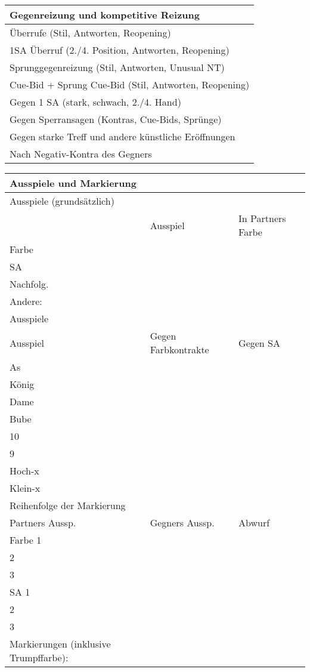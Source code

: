 \documentclass{article}
\begin{document}
\begin{multicols}{3}

\begin{tabular}{|l|}
\hline Gegenreizung und kompetitive Reizung \\
\hline Überrufe (Stil, Antworten, Reopening) \\
\hline 1SA Überruf (2./4. Position, Antworten, Reopening) \\
\hline Sprunggegenreizung (Stil, Antworten, Unusual NT) \\
\hline Cue-Bid + Sprung Cue-Bid (Stil, Antworten, Reopening) \\
\hline Gegen 1 SA (stark, schwach, 2./4. Hand) \\
\hline Gegen Sperransagen (Kontras, Cue-Bids, Sprünge) \\
\hline Gegen starke Treff und andere künstliche Eröffnungen \\
\hline Nach Negativ-Kontra des Gegners \\
\hline \end{tabular}

\begin{tabular}{|l|l|l|}
\hline Ausspiele und Markierung \\
\hline Ausspiele (grundsätzlich) \\
\hline & Ausspiel & In Partners Farbe \\
\hline Farbe & \\
\hline SA & \\
\hline Nachfolg. & \\
\hline Andere: \\

\hline Ausspiele \\
\hline Ausspiel & Gegen Farbkontrakte & Gegen SA \\
\hline As \\
\hline König \\
\hline Dame \\
\hline Bube \\
\hline 10 \\
\hline 9 \\
\hline Hoch-x \\
\hline Klein-x \\

\hline Reihenfolge der Markierung \\
\hline Partners Aussp. & Gegners Aussp. & Abwurf \\
\hline Farbe 1 \\
\hline 2 \\
\hline 3 \\
\hline SA 1 \\
\hline 2 \\
\hline 3 \\
\hline Markierungen (inklusive Trumpffarbe): \\


\end{tabular}
\end{multicols}
\end{document}

